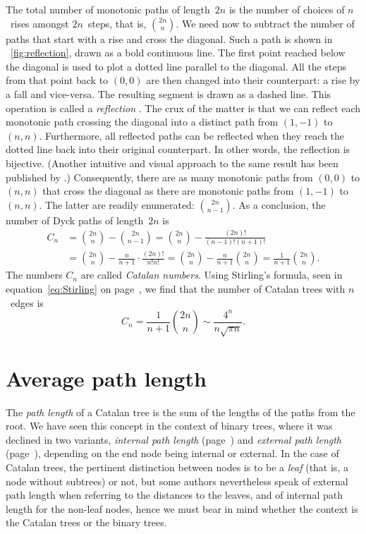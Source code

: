 The total number of monotonic paths of length~\(2n\) is the number of
choices of \(n\)~rises amongst \(2n\)~steps, that is,
\(\binom{2n}{n}\). We need now to subtract the number of paths that
start with a rise and cross the diagonal. Such a path is shown in
\fig~\ref{fig:reflection}, drawn as a bold continuous line. The first
point reached below the diagonal is used to plot a dotted line
parallel to the diagonal. All the steps from that point back to
\((0,0)\) are then changed into their counterpart: a rise by a fall
and vice-versa. The resulting segment is drawn as a dashed line. This
operation is called a \emph{reflection} \citep{Renault_2008}. The crux
of the matter is that we can reflect each monotonic path crossing the
diagonal into a distinct path from \((1,-1)\) to
\((n,n)\). Furthermore, all reflected paths can be reflected when they
reach the dotted line back into their original counterpart. In other
words, the reflection is bijective. (Another intuitive and visual
approach to the same result has been published by \cite{Callan_1995}.)
Consequently, there are as many monotonic paths from \((0,0)\) to
\((n,n)\) that cross the diagonal as there are monotonic paths from
\((1,-1)\) to \((n,n)\). The latter are readily enumerated:
\(\binom{2n}{n-1}\). As a conclusion, the number of Dyck paths of
length~\(2n\) is\label{eq:Ann}
\begin{align*}
C_n &= \binom{2n}{n} - \binom{2n}{n-1}
= \binom{2n}{n} - \frac{(2n)!}{(n-1)!(n+1)!}\\
&= \binom{2n}{n} - \frac{n}{n+1} \cdot \frac{(2n)!}{n!n!}
 = \binom{2n}{n} - \frac{n}{n+1} \binom{2n}{n} = \frac{1}{n+1}\binom{2n}{n}.
\end{align*}
The numbers \(C_n\) are called \emph{Catalan numbers}. Using Stirling's
formula, seen in
equation~\eqref{eq:Stirling} on page~\pageref{eq:Stirling}, we find
that the number of Catalan trees with \(n\)~edges is
\begin{equation}
  C_n = \frac{1}{n+1}\binom{2n}{n} \sim \frac{4^n}{n\sqrt{\pi n}}.
\label{eq:Cn}
\end{equation}

\section{Average path length}

The \emph{path length} of a Catalan tree is the sum of the lengths of
the paths from the root. We have seen this concept in the context of
binary trees, where it was declined in two variants, \emph{internal
  path length} (page~\pageref{insertion__internal_path_length}) and
\emph{external path length}
(page~\pageref{sorting__external_path_length}), depending on the end
node being internal or external. In the case of Catalan trees, the
pertinent distinction between nodes is to be a \emph{leaf} (that is, a
node without subtrees) or not, but some authors nevertheless speak of
external path length when referring to the distances to the leaves,
and of internal path length for the non\hyp{}leaf nodes, hence we must
bear in mind whether the context is the Catalan trees or the binary
trees.

